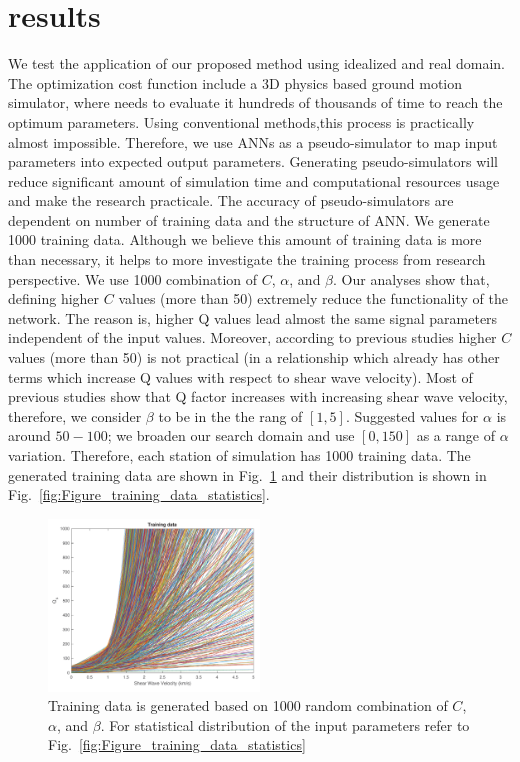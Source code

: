 \section{results}
 
We test the application of our proposed method using idealized and real domain. The optimization cost function include a 3D physics based ground motion simulator, where needs to evaluate it hundreds of thousands of time to reach the optimum parameters. Using conventional methods,this process is practically almost impossible. Therefore, we use ANNs as a pseudo-simulator to map input parameters into expected output parameters. Generating pseudo-simulators will reduce significant amount of simulation time and computational resources usage and make the research practicale. The accuracy of pseudo-simulators are dependent on number of training data and the structure of ANN. We generate 1000 training data. Although we believe this amount of training data is more than necessary, it helps to more investigate the training process from research perspective. We use 1000 combination of $C$, $\alpha$, and $\beta$. Our analyses show that, defining higher $C$ values (more than 50) extremely reduce the functionality of the network. The reason is, higher Q values lead almost the same signal parameters independent of the input values. Moreover, according to previous studies higher $C$ values (more than 50) is not practical (in a relationship which already has other terms which increase Q values with respect to shear wave velocity). Most of previous studies show that Q factor increases with increasing shear wave velocity, therefore, we consider $\beta$ to be in the the rang of $[1,5]$. Suggested values for $\alpha$ is around $50-100$; we broaden our search domain and use $[0,150]$ as a range of $\alpha$ variation. Therefore, each station of simulation has 1000 training data. The generated training data are shown in Fig.~\ref{fig:Figure_training_data} and their distribution is shown in Fig.~\ref{fig:Figure_training_data_statistics}. 

 \begin{figure}[ht]
    \centering
    \includegraphics[width=0.5\textwidth]{figures/pdf/Figure_training_data.pdf}
    \caption{Training data is generated based on 1000 random combination of $C$, $\alpha$, and $\beta$. For statistical distribution of the input parameters refer to Fig.~\ref{fig:Figure_training_data_statistics}}
    \label{fig:Figure_training_data}
\end{figure}

